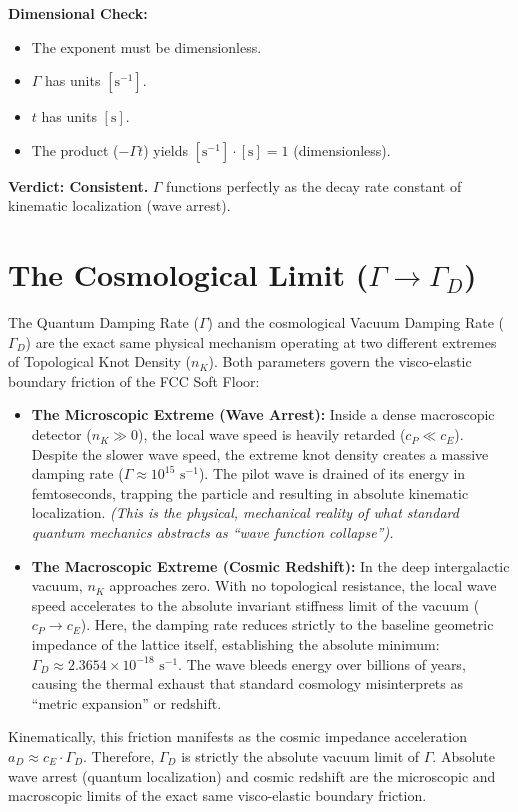 \textbf{Dimensional Check:}
\begin{itemize}
    \item The exponent must be dimensionless.
    \item $\Gamma$ has units $[\text{s}^{-1}]$.
    \item $t$ has units $[\text{s}]$.
    \item The product ($-\Gamma t$) yields $[\text{s}^{-1}] \cdot [\text{s}] = 1$ (dimensionless).
\end{itemize}

\textbf{Verdict: Consistent.} $\Gamma$ functions perfectly as the decay rate constant of kinematic localization (wave arrest).

\section{The Cosmological Limit ($\Gamma \to \Gamma_D$)}
The Quantum Damping Rate ($\Gamma$) and the cosmological Vacuum Damping Rate ($\Gamma_D$) are the exact same physical mechanism operating at two different extremes of Topological Knot Density ($n_K$). Both parameters govern the visco-elastic boundary friction of the FCC Soft Floor:

\begin{itemize}
    \item \textbf{The Microscopic Extreme (Wave Arrest):} Inside a dense macroscopic detector ($n_K \gg 0$), the local wave speed is heavily retarded ($c_P \ll c_E$). Despite the slower wave speed, the extreme knot density creates a massive damping rate ($\Gamma \approx 10^{15} \text{ s}^{-1}$). The pilot wave is drained of its energy in femtoseconds, trapping the particle and resulting in absolute kinematic localization. \textit{(This is the physical, mechanical reality of what standard quantum mechanics abstracts as ``wave function collapse'').}
    
    \item \textbf{The Macroscopic Extreme (Cosmic Redshift):} In the deep intergalactic vacuum, $n_K$ approaches zero. With no topological resistance, the local wave speed accelerates to the absolute invariant stiffness limit of the vacuum ($c_P \to c_E$). Here, the damping rate reduces strictly to the baseline geometric impedance of the lattice itself, establishing the absolute minimum: $\Gamma_D \approx 2.3654 \times 10^{-18} \text{ s}^{-1}$. The wave bleeds energy over billions of years, causing the thermal exhaust that standard cosmology misinterprets as ``metric expansion'' or redshift.
\end{itemize}

Kinematically, this friction manifests as the cosmic impedance acceleration $a_D \approx c_E \cdot \Gamma_D$. Therefore, $\Gamma_D$ is strictly the absolute vacuum limit of $\Gamma$. Absolute wave arrest (quantum localization) and cosmic redshift are the microscopic and macroscopic limits of the exact same visco-elastic boundary friction.